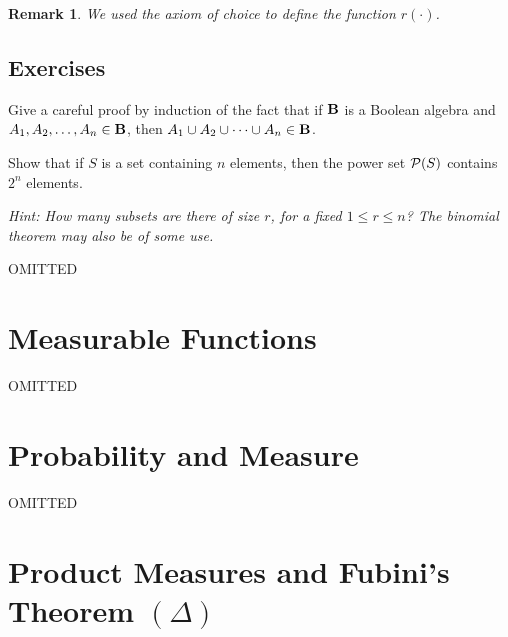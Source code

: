 \documentclass[a4paper]{report}
\newcounter{thm_counter}[chapter]
\newtheorem{remark}[thm_counter]{Remark}
\numberwithin{equation}{chapter}
\numberwithin{thm_counter}{section}
\begin{document}
\begin{remark}
We used the axiom of choice to define the function $r(\cdot)$. 
\end{remark}



\newpage
\section[Exercises 1]{Exercises}


\begin{pslist}

\item 
\label{ps:boolean_union}
Give a careful proof by induction of the fact that if ${\bf B}$ is a Boolean algebra and $A_{1}, A_{2}, \ldots, A_{n} \in {\bf B}$, then $A_{1} \cup A_{2} \cup \cdots \cup A_{n} \in {\bf B}$.

\item 
\label{ps:size_Pn}
Show that if $S$ is a set containing $n$ elements, then the power set ${\cal P}(S)$ contains $2^{n}$ elements.

\textit{Hint: How many subsets are there of size $r$, for a fixed $1 \leq r \leq n$? The binomial theorem may also be of some use.}

\item OMITTED

\end{pslist}




\chapter{Measurable Functions}
\label{chap:measurable_funcs}

OMITTED


\chapter{Probability and Measure}
\label{chap:prob_with_meas}

OMITTED



\chapter{Product Measures and Fubini's Theorem \((\Delta)\)}
\label{chap:product_meas}
\end{document}
